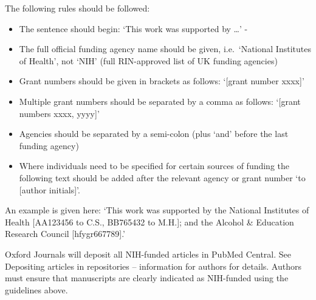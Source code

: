 \documentclass{bioinfo}
\providecommand{\tightlist}{%
  \setlength{\itemsep}{0pt}\setlength{\parskip}{0pt}}
\begin{document}
The following rules should be followed:

\begin{itemize}
\tightlist
\item
  The sentence should begin: `This work was supported by \ldots{}' -
\item
  The full official funding agency name should be given, i.e.~`National
  Institutes of Health', not `NIH' (full RIN-approved list of UK funding
  agencies)
\item
  Grant numbers should be given in brackets as follows: `{[}grant number
  xxxx{]}'
\item
  Multiple grant numbers should be separated by a comma as follows:
  `{[}grant numbers xxxx, yyyy{]}'
\item
  Agencies should be separated by a semi-colon (plus `and' before the
  last funding agency)
\item
  Where individuals need to be specified for certain sources of funding
  the following text should be added after the relevant agency or grant
  number `to {[}author initials{]}'.
\end{itemize}

An example is given here: `This work was supported by the National
Institutes of Health {[}AA123456 to C.S., BB765432 to M.H.{]}; and the
Alcohol \& Education Research Council {[}hfygr667789{]}.'

Oxford Journals will deposit all NIH-funded articles in PubMed Central.
See Depositing articles in repositories -- information for authors for
details. Authors must ensure that manuscripts are clearly indicated as
NIH-funded using the guidelines above.




\end{document}
